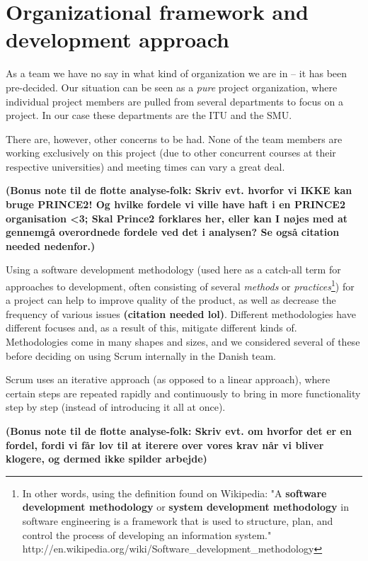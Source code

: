 \section{Organizational framework and development approach}
\label{sec:organizational}

As a team we have no say in what kind of organization we are in – it has been pre-decided. Our
situation can be seen as a \emph{pure} project organization\cite{caye}, where individual project members are
pulled from several departments to focus on a project. In our case these departments are the
ITU and the SMU.

There are, however, other concerns to be had. None of the team members are working exclusively
on this project (due to other concurrent courses at their respective universities) and meeting
times can vary a great deal.

\textbf{(Bonus note til de flotte analyse-folk: Skriv evt. hvorfor vi IKKE kan bruge PRINCE2!
Og hvilke fordele vi ville have haft i en PRINCE2 organisation <3; Skal Prince2 forklares her,
eller kan I nøjes med at gennemgå overordnede fordele ved det i analysen? Se også citation
needed nedenfor.)}


Using a software development methodology (used here as a catch-all term for approaches to
development, often consisting of several \emph{methods} or \emph{practices}\footnote{In other
words, using the definition found on Wikipedia: "A \textbf{software development methodology}
or \textbf{system development methodology} in software engineering is a framework that is used
to structure, plan, and control the process of developing an information system."
http://en.wikipedia.org/wiki/Software_development_methodology}) for a project can help to
improve quality of the product, as well as decrease the frequency of various issues \textbf{
(citation needed lol)}. Different methodologies have different focuses and, as a result of
this, mitigate different kinds of. Methodologies come in many shapes and sizes, and we
considered several of these before deciding on using Scrum internally in the Danish team.

Scrum uses an iterative approach (as opposed to a linear approach), where certain steps are
repeated rapidly and continuously to bring in more functionality step by step (instead of
introducing it all at once).

\textbf{(Bonus note til de flotte analyse-folk: Skriv evt. om hvorfor det er en fordel, fordi
vi får lov til at iterere over vores krav når vi bliver klogere, og dermed ikke spilder arbejde)}

